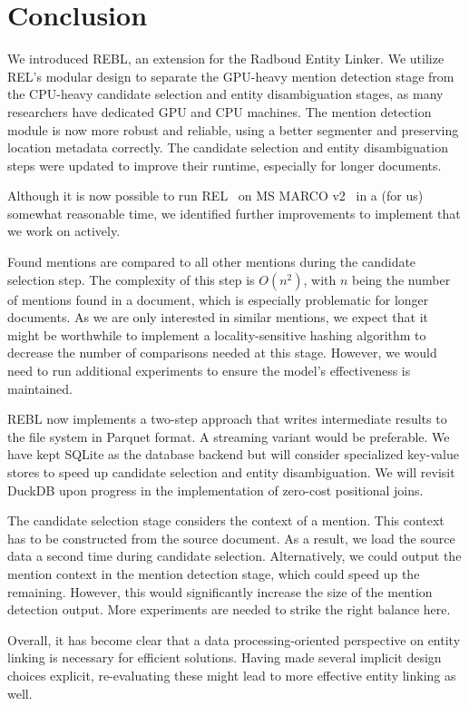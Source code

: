 \section{Conclusion}
We introduced REBL, an extension for the Radboud Entity Linker. We utilize REL's modular design to separate the GPU-heavy mention detection stage from the CPU-heavy candidate selection and entity disambiguation stages, as many researchers have dedicated GPU and CPU machines. The mention detection module is now more robust and reliable, using a better segmenter and preserving location metadata correctly.
The candidate selection and entity disambiguation steps were updated to improve their runtime, especially for longer documents. 

Although it is now possible to run REL~\cite{REL} on MS MARCO v2~\cite{msmarco} in a (for us) somewhat reasonable time, we identified further improvements to implement that we work on actively. 

Found mentions are compared to all other mentions during the candidate selection step. The complexity of this step is $O(n^2)$, with $n$ being the number of mentions found in a document, which is especially problematic for longer documents. As we are only interested in similar mentions, we expect that it might be worthwhile to implement a locality-sensitive hashing algorithm to decrease the number of comparisons needed at this stage. However, we would need to run additional experiments to ensure the model's effectiveness is maintained. 

REBL now implements a two-step approach that writes intermediate results to the file system in Parquet format. A streaming variant would be preferable. We have kept SQLite as the database backend but will consider specialized key-value stores to speed up candidate selection and entity disambiguation. We will revisit DuckDB upon progress in the implementation of zero-cost positional joins.  

The candidate selection stage considers the context of a mention. This context has to be constructed from the source document. As a result, we load the source data a second time during candidate selection. Alternatively, we could output the mention context in the mention detection stage, which could speed up the remaining. However, this would significantly increase the size of the mention detection output. More experiments are needed to strike the right balance here.

Overall, it has become clear that a data processing-oriented perspective on entity linking is necessary for efficient solutions. Having made several implicit design choices explicit, re-evaluating these might lead to more effective entity linking as well. 